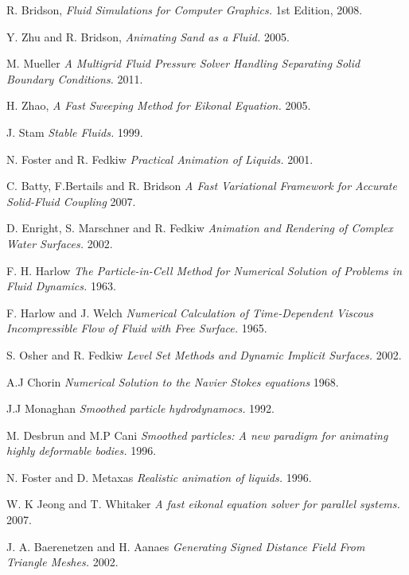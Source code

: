 \begin{thebibliography}{9}

  R. Bridson,
  \emph{Fluid Simulations for Computer Graphics.}
  1st Edition,
  2008.

  Y. Zhu and R. Bridson,
  \emph{Animating Sand as a Fluid.}
  2005.

  M. Mueller
  \emph{A Multigrid Fluid Pressure Solver Handling Separating Solid Boundary Conditions.}
  2011.

  H. Zhao, 
  \emph{A Fast Sweeping Method for Eikonal Equation.}
  2005.

  J. Stam
  \emph{Stable Fluids.}
  1999.

  N. Foster and R. Fedkiw
  \emph{Practical Animation of Liquids.}
  2001.

  C. Batty, F.Bertails and R. Bridson
  \emph{A Fast Variational Framework for Accurate Solid-Fluid Coupling}
  2007.

  D. Enright, S. Marschner and R. Fedkiw
  \emph{Animation and Rendering of Complex Water Surfaces.}
  2002.

  F. H. Harlow 
  \emph{The Particle-in-Cell Method for Numerical Solution of Problems in Fluid Dynamics.}
  1963.

  F. Harlow and J. Welch
  \emph{Numerical Calculation of Time-Dependent Viscous Incompressible Flow of Fluid with Free Surface.}
  1965.

  S. Osher and R. Fedkiw
  \emph{Level Set Methods and Dynamic Implicit Surfaces.}
  2002.

  A.J Chorin
  \emph{Numerical Solution to the Navier Stokes equations}
  1968.

 J.J Monaghan
 \emph{Smoothed particle hydrodynamocs.}
 1992.

  M. Desbrun and M.P Cani
  \emph {Smoothed particles: A new paradigm for animating highly deformable bodies.}
  1996.

  N. Foster and D. Metaxas
  \emph{Realistic animation of liquids.}
  1996.

  W. K Jeong and T. Whitaker
  \emph{A fast eikonal equation solver for parallel systems.}
  2007.

  J. A. Baerenetzen and H. Aanaes
  \emph{Generating Signed Distance Field From Triangle Meshes.}
  2002.

\end{thebibliography}
